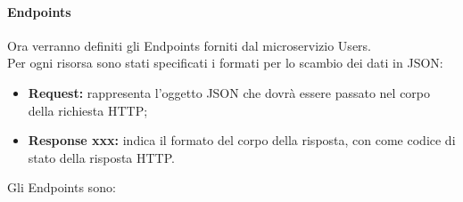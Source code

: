 \paragraph{Endpoints}

Ora verranno definiti gli Endpoints forniti dal microservizio Users. \\
Per ogni risorsa sono stati specificati i formati per lo scambio dei dati in JSON:
\begin{itemize}
\item \textbf{Request:} rappresenta l’oggetto JSON che dovrà essere passato nel corpo della richiesta HTTP;
\item \textbf{Response xxx:} indica il formato del corpo della risposta, con  come codice di stato della risposta HTTP.
\end{itemize}

Gli Endpoints sono:

